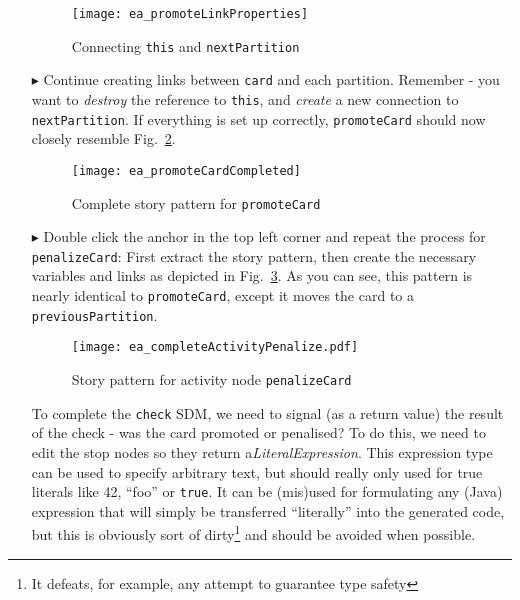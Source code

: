 \begin{itemize}
\begin{figure}[htbp]
\begin{center}
  \texttt{[image: ea\_promoteLinkProperties]}
  \caption{Connecting \texttt{this} and \texttt{nextPartition}}
  \label{fig:sdm_check_link_variable}
\end{center}
\end{figure}

\vspace{0.5cm}

\item[$\blacktriangleright$] Continue creating links between \texttt{card} and each partition. Remember - you want to \emph{destroy} the reference to
\texttt{this}, and \emph{create} a new connection to \texttt{nextPartition}. If everything is set up correctly, \texttt{promoteCard} should now closely resemble
Fig.~\ref{fig:sdm_check_complete_activity_node}.

\begin{figure}[htbp]
\begin{center}
  \texttt{[image: ea\_promoteCardCompleted]}
  \caption{Complete story pattern for \texttt{promoteCard}}
  \label{fig:sdm_check_complete_activity_node}
\end{center}
\end{figure}

\clearpage

\item[$\blacktriangleright$] Double click the anchor in the top left corner and repeat the process for \texttt{penalizeCard}: First extract the story pattern,
then create the necessary variables and links as depicted in Fig.~\ref{fig:sdm_check_complete_penalize}. As you can see, this pattern is nearly identical to
\texttt{promoteCard}, except it moves the card to a \texttt{previousPartition}.

\vspace{0.5cm}

\begin{figure}[htbp]
\begin{center}
  \texttt{[image: ea\_completeActivityPenalize.pdf]}
  \caption{Story pattern for activity node \texttt{penalizeCard}}
  \label{fig:sdm_check_complete_penalize}
\end{center}
\end{figure}


\vspace{0.5cm}

To complete the \texttt{check} SDM, we need to signal (as a return value) the result of the check - was the card promoted or penalised? To do this, we need to
edit the stop nodes so they return a\emph{LiteralExpression}. This expression type can be used to specify arbitrary text, but
should really only used for true literals like 42, ``foo'' or \texttt{true}. It can be (mis)used for formulating any (Java) expression that will simply be
transferred ``literally'' into the generated code, but this is obviously sort of dirty\footnote{It defeats, for example, any attempt to guarantee type safety}
and should be avoided when possible.


\end{itemize}
